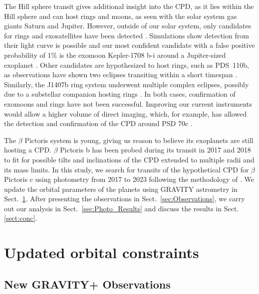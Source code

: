 \documentclass{aa}
\newcommand\picb{$\beta$ Pictoris b}
\newcommand\picc{$\beta$ Pictoris c}
\newcommand\pic{$\beta$ Pictoris}
\begin{document}
The Hill sphere transit gives additional insight into the CPD, as it lies within the Hill sphere and can host rings and moons, as seen with the solar system gas giants Saturn and Jupiter. 
%
However, outside of our solar system, only candidates for rings and exosatellites have been detected \citep{Osborn_2019,Kenworthy_Mamajek_2015,Mamajek_2012,Rieder_2016}. 
%
Simulations show detection from their light curve is possible \citep{Alshehhi_2020,Akinsanmi_2017} and our most confident candidate with a false positive probability of 1\% is the exomoon Kepler-1708 b-i around a Jupiter-sized exoplanet \citep{Kipping_2022}. 
%
Other candidates are hypothesized to host rings, such as PDS~110b, as observations have shown two eclipses transiting within a short timespan \citep{Osborn_2019}. 
%
Similarly, the J1407b ring system underwent multiple complex eclipses, possibly due to a substellar companion hosting rings \citep{Kenworthy_Mamajek_2015,Mamajek_2012,Rieder_2016}. 
%
In both cases, confirmation of exomoons and rings have not been successful. 
%
Improving our current instruments would allow a higher volume of direct imaging, which, for example, has allowed the detection and confirmation of the CPD around PSD 70c \citep{Benisty_2021}. 
%

The \pic{} system is young, giving us reason to believe its exoplanets are still hosting a CPD. 
%
\picb{} has been probed during its transit in 2017 and 2018 \citep{Kenworthy_2021} to fit for possible tilts and inclinations of the CPD extended to multiple radii and its mass limits. 
%
In this study, we search for transits of the hypothetical CPD for \picc{} using photometry from 2017 to 2023 following the methodology of \citet{Kenworthy_2021}.
%
We update the orbital parameters of the planets using GRAVITY astrometry in Sect.~\ref{sec:new_grav}.
%
After presenting the observations in Sect.~\ref{sec:Observations}, we carry out our analysis in Sect.~\ref{sec:Photo_Results} and discuss the results in Sect.\ref{sect:conc}.


\section{Updated orbital constraints}\label{sec:new_grav}

\subsection{New GRAVITY+ Observations}
\end{document}
